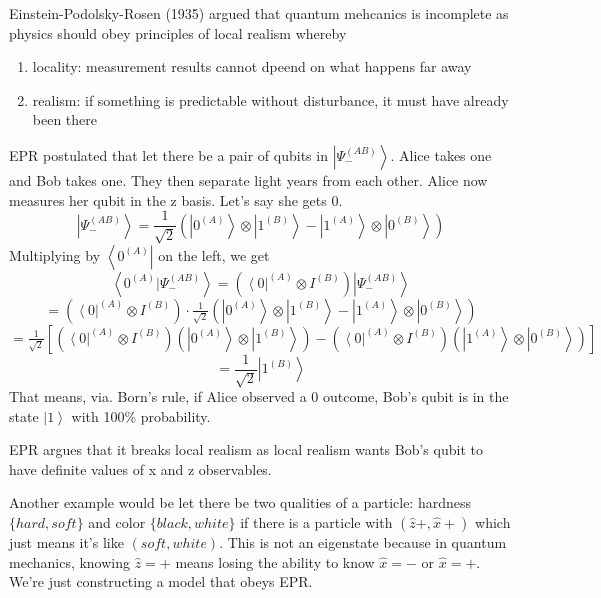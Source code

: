 \documentclass[
]{article}
\providecommand{\ket}[1]{\left\lvert #1 \right\rangle}
\providecommand{\bra}[1]{\left\langle #1 \right\rvert}
\providecommand{\braket}[1]{\left\langle #1 \right\rangle}
\begin{document}
Einstein-Podolsky-Rosen (1935) argued that quantum mehcanics is incomplete as physics should obey principles of local realism whereby
\begin{enumerate}
	\item locality: measurement results cannot dpeend on what happens far away
	\item realism: if something is predictable without disturbance, it must have already been there
\end{enumerate}

EPR postulated that let there be a pair of qubits in $\ket{\Psi_-^{(AB)}}$. Alice takes one and Bob takes one. They then separate light years from each other.
Alice now measures her qubit in the z basis. Let's say she gets $0$.
\[
	\ket{\Psi_-^{(AB)}}=\frac{1}{\sqrt{2}}\left(\ket{{0}^{(A)}}\otimes \ket{1^{(B)}}-\ket{1^{(A)}}\otimes \ket{{0}^{(B)}}\right)
\]
Multiplying by $\bra{{0}^{(A)}}$ on the left, we get
\[
	\braket{{0}^{(A)} | \Psi_-^{(AB)}} = \left(\bra{0}^{(A)} \otimes I^{(B)}\right) \ket{\Psi_-^{(AB)}}
\]
\[
	= \left(\bra{0}^{(A)} \otimes I^{(B)}\right) \cdot \tfrac{1}{\sqrt{2}}\left(\ket{{0}^{(A)}} \otimes \ket{1^{(B)}} - \ket{1^{(A)}} \otimes \ket{{0}^{(B)}}\right)
\]
\[
	= \tfrac{1}{\sqrt{2}}\left[\left(\bra{0}^{(A)} \otimes I^{(B)}\right)\left(\ket{{0}^{(A)}} \otimes \ket{1^{(B)}}\right) - \left(\bra{0}^{(A)} \otimes I^{(B)}\right)\left(\ket{1^{(A)}} \otimes \ket{{0}^{(B)}}\right)\right]
\]
\[
	=\frac{1}{\sqrt{2}}\ket{1^{(B)}}
\]
That means, via. Born's rule, if Alice observed a $0$ outcome, Bob's qubit is in the state $\ket{1}$ with 100\% probability.

EPR argues that it breaks local realism as local realism wants Bob's qubit to have definite values of x and z observables.

Another example would be let there be two qualities of a particle: hardness $\{hard,soft\}$ and color $\{black, white\}$ if there is a particle with $(\hat{z}+, \hat{x}+)$ which just means it's like $(soft, white)$. This is not an eigenstate because in quantum mechanics, knowing $\hat{z}=+$ means losing the ability to know $\hat{x}=-$ or $\hat{x}=+$.
We're just constructing a model that obeys EPR.




\newpage
{}
\end{document}
